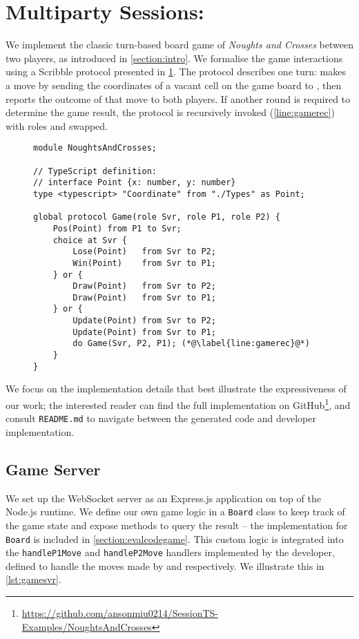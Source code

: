 \section{Multiparty Sessions: }
\label{section:evalgame}

We implement the classic turn-based board game of \textit{Noughts and Crosses}
between two players,
as introduced in \cref{section:intro}.
We formalise the game interactions using a Scribble protocol
presented in \cref{lst:game}.
The  protocol describes one turn:
 makes a move by sending the coordinates of a
vacant cell on the game board to ,
then  reports the outcome of that move
to both players. If another round is required
to determine the game result, the 
protocol is recursively invoked (\cref{line:gamerec}) with
roles  and  swapped.

\begin{figure}[!ht]
\begin{lstlisting}[language=Scribble]
module NoughtsAndCrosses;

// TypeScript definition:
// interface Point {x: number, y: number}
type <typescript> "Coordinate" from "./Types" as Point;

global protocol Game(role Svr, role P1, role P2) {
	Pos(Point) from P1 to Svr;
	choice at Svr {
		Lose(Point)   from Svr to P2;
		Win(Point)    from Svr to P1;
	} or {
		Draw(Point)   from Svr to P2;
		Draw(Point)   from Svr to P1;
	} or {
		Update(Point) from Svr to P2;
		Update(Point) from Svr to P1;
		do Game(Svr, P2, P1); (*@\label{line:gamerec}@*)
	}
}
\end{lstlisting}
\label{lst:game}
\end{figure}

We focus on the implementation details that
best illustrate the expressiveness of our work;
the interested reader can find the full implementation on
GitHub\footnote{
\url{https://github.com/ansonmiu0214/SessionTS-Examples/NoughtsAndCrosses}
}, and consult \texttt{README.md} to navigate between the generated code
and developer implementation.

\subsection{Game Server}
We set up the WebSocket server as an Express.js \cite{Express} application
on top of the Node.js runtime.
We define our own game logic in a \texttt{Board} class
to keep track of the game state and expose methods 
to query the result -- the implementation for \texttt{Board} is included
in \cref{section:evalcodegame}.
This custom logic is integrated into the 
\texttt{handleP1Move} and \texttt{handleP2Move}
handlers implemented by the developer, defined to
handle the moves made by  and  respectively.
We illustrate this in \cref{lst:gamesvr}.

